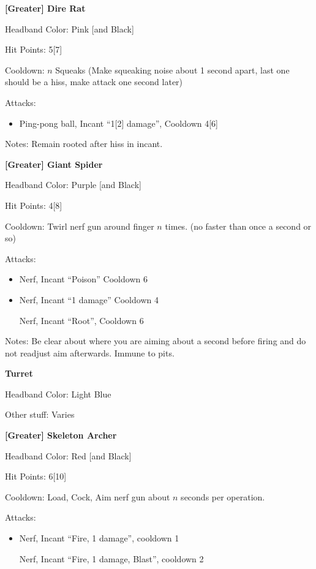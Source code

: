 \documentclass[green]{grimrock}
\begin{document}
\name{\gNPC{}}

{\bf [Greater] Dire Rat}

Headband Color: Pink [and Black]

Hit Points: 5[7]

Cooldown: $n$ Squeaks (Make squeaking noise about 1 second apart, last one should be a hiss, make attack one second later)

Attacks: 
\begin{itemize}
\item Ping-pong ball, Incant ``1[2] damage'', Cooldown 4[6]
\end{itemize}

Notes: Remain rooted after hiss in incant.

\medskip

{\bf [Greater] Giant Spider}

Headband Color: Purple [and Black]

Hit Points: 4[8]

Cooldown: Twirl nerf gun around finger $n$ times. (no faster than once a second or so)

Attacks: 
\begin{itemize}
\item Nerf, Incant ``Poison'' Cooldown 6
\item Nerf, Incant ``1 damage'' Cooldown 4
\item [Nerf, Incant ``Root'', Cooldown 6]
\end{itemize}

Notes: Be clear about where you are aiming about a second before firing and do not readjust aim afterwards. Immune to pits.

\medskip

{\bf Turret}

Headband Color: Light Blue

Other stuff: Varies

\medskip

{\bf [Greater] Skeleton Archer}

Headband Color: Red [and Black]

Hit Points: 6[10]

Cooldown: Load, Cock, Aim nerf gun about $n$ seconds per operation.

Attacks:
\begin{itemize}
\item Nerf, Incant ``Fire, 1 damage'', cooldown 1
\item [Nerf, Incant ``Fire, 1 damage, Blast'', cooldown 2]
\end{itemize}
\end{document}
